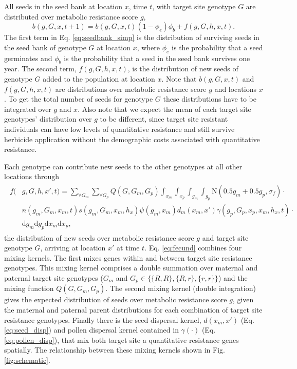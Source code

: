 \documentclass[10pt,letterpaper]{article}
\begin{document}
All seeds in the seed bank at location $x$, time $t$, with target site genotype $G$ are distributed over metabolic resistance score $g$,
\begin{equation}\label{eq:seedbank_simp}
	b(g, G, x, t + 1) = b(g, G, x, t)(1 - \phi_e)\phi_b + f(g, G, h, x, t). 
\end{equation}
The first term in Eq. \ref{eq:seedbank_simp} is the distribution of surviving seeds in the seed bank of genotype $G$ at location $x$, where $\phi_e$ is the probability that a seed germinates and $\phi_b$ is the probability that a seed in the seed bank survives one year. The second term, $f(g, G, h, x, t)$, is the distribution of new seeds of genotype $G$ added to the population at location $x$. Note that $b(g, G, x, t)$ and $f(g, G, h, x, t)$ are distributions over metabolic resistance score $g$ and locations $x$. To get the total number of seeds for genotype $G$ these distributions have to be integrated over $g$ and $x$. Also note that we expect the mean of each target site genotypes' distribution over $g$ to be different, since target site resistant individuals can have low levels of quantitative resistance and still survive herbicide application without the demographic costs associated with quantitative resistance. 

Each genotype can contribute new seeds to the other genotypes at all other locations through       
\begin{align}
\label{eq:fecund}
\begin{split}
	f(&g, G, h, x', t) = \displaystyle \sum_{\forall G_m}\sum_{\forall G_p} Q(G, G_m, G_p) \int_{x_m}\int_{x_p}\int_{g_m}\int_{g_p} \text{N}(0.5 g_m + 0.5 g_p, \sigma_f)\cdot\\
	&n(g_m, G_m, x_m, t)s(g_m, G_m, x_m, h_x) \psi(g_m, x_m) d_m(x_m, x') \gamma(g_p, G_p, x_p, x_m, h_x, t)\cdot\\
	&\text{d}g_m \text{d}g_p \text{d}x_m \text{d}x_p,
\end{split}
\end{align} 
the distribution of new seeds over metabolic resistance score $g$ and target site genotype $G$, arriving at location $x'$ at time $t$. Eq. \ref{eq:fecund} combines four mixing kernels. The first mixes genes within and between target site resistance genotypes. This mixing kernel comprises a double summation over maternal and paternal target site genotypes ($G_m$ and $G_p \in \{\{R, R\}, \{R, r\}, \{r, r\} \}$) and the mixing function $Q(G, G_m, G_p)$. The second mixing kernel (double integration) gives the expected distribution of seeds over metabolic resistance score $g$, given the maternal and paternal parent distributions for each combination of target site resistance genotypes. Finally there is the seed dispersal kernel, $d(x_m, x')$ (Eq. \ref{eq:seed_disp}) and pollen dispersal kernel contained in $\gamma(\cdot)$ (Eq. \ref{eq:pollen_disp}), that mix both target site a quantitative resistance genes spatially. The relationship between these mixing kernels shown in Fig. \ref{fig:schematic}. 
\end{document}
